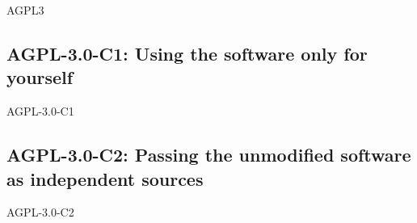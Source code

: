 
\newcommand{\auxArrange}[1]{Arrange the #1 of the on-top development in a way
  that they are covered by the GPL-\ver{} licensing statements.} 

\newcommand{\arrangeEnclosingBinaries}{%
  \auxArrange{the binaries of the on-top development}}

\newcommand{\arrangeEnclosingSources}{%
  \auxArrange{the sources of the on-top development}}



\newcommand{\ver}{3.0}

\begin{license}{AGPL3} 

\subsection{AGPL-\ver-C1: Using the software only for yourself}
\begin{lsuc}{AGPL-\ver-C1}

  \useCaseOne

  \begin{lsucrequiresnothing}
  \end{lsucrequiresnothing}

  \begin{lsucprohibits}
    \lsucitem{\noPatentLitigation}
  \end{lsucprohibits}
\end{lsuc}

\subsection{AGPL-\ver-C2: Passing the unmodified software as independent sources}
\begin{lsuc}{AGPL-\ver-C2}


\end{lsuc}
\end{license}
